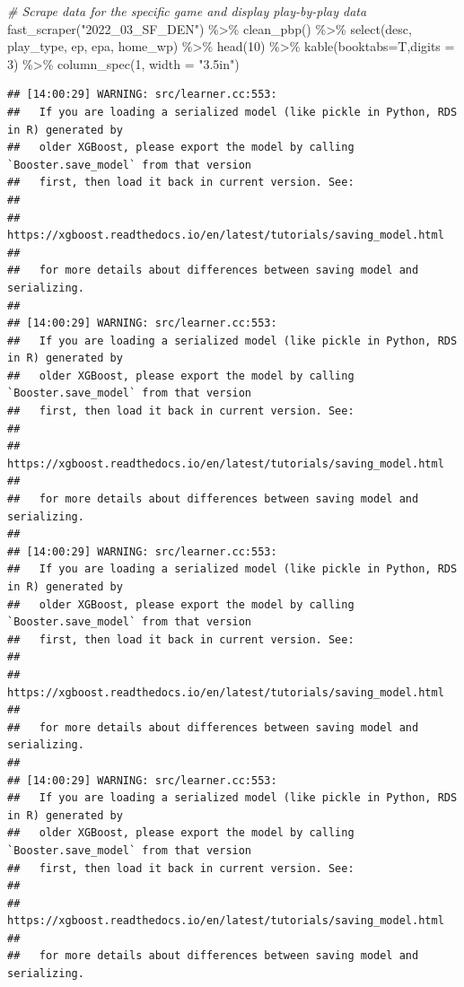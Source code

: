 \documentclass[
  11pt,
]{book}
\newenvironment{Shaded}{\begin{snugshade}}{\end{snugshade}}
\newcommand{\AttributeTok}[1]{\textcolor[rgb]{0.77,0.63,0.00}{#1}}
\newcommand{\CommentTok}[1]{\textcolor[rgb]{0.56,0.35,0.01}{\textit{#1}}}
\newcommand{\DecValTok}[1]{\textcolor[rgb]{0.00,0.00,0.81}{#1}}
\newcommand{\FunctionTok}[1]{\textcolor[rgb]{0.00,0.00,0.00}{#1}}
\newcommand{\NormalTok}[1]{#1}
\newcommand{\SpecialCharTok}[1]{\textcolor[rgb]{0.00,0.00,0.00}{#1}}
\newcommand{\StringTok}[1]{\textcolor[rgb]{0.31,0.60,0.02}{#1}}
\theoremstyle{definition}
\theoremstyle{definition}
\theoremstyle{definition}
\theoremstyle{definition}
\theoremstyle{remark}
\begin{document}
\newpage

\begin{Shaded}
\begin{Highlighting}[]
\CommentTok{\# Scrape data for the specific game and display play{-}by{-}play data}
\FunctionTok{fast\_scraper}\NormalTok{(}\StringTok{"2022\_03\_SF\_DEN"}\NormalTok{) }\SpecialCharTok{\%\textgreater{}\%}
  \FunctionTok{clean\_pbp}\NormalTok{() }\SpecialCharTok{\%\textgreater{}\%}
  \FunctionTok{select}\NormalTok{(desc, play\_type, ep, epa, home\_wp) }\SpecialCharTok{\%\textgreater{}\%}
  \FunctionTok{head}\NormalTok{(}\DecValTok{10}\NormalTok{) }\SpecialCharTok{\%\textgreater{}\%}
  \FunctionTok{kable}\NormalTok{(}\AttributeTok{booktabs=}\NormalTok{T,}\AttributeTok{digits =} \DecValTok{3}\NormalTok{) }\SpecialCharTok{\%\textgreater{}\%}
  \FunctionTok{column\_spec}\NormalTok{(}\DecValTok{1}\NormalTok{, }\AttributeTok{width =} \StringTok{"3.5in"}\NormalTok{)}
\end{Highlighting}
\end{Shaded}

\begin{verbatim}
## [14:00:29] WARNING: src/learner.cc:553: 
##   If you are loading a serialized model (like pickle in Python, RDS in R) generated by
##   older XGBoost, please export the model by calling `Booster.save_model` from that version
##   first, then load it back in current version. See:
## 
##     https://xgboost.readthedocs.io/en/latest/tutorials/saving_model.html
## 
##   for more details about differences between saving model and serializing.
## 
## [14:00:29] WARNING: src/learner.cc:553: 
##   If you are loading a serialized model (like pickle in Python, RDS in R) generated by
##   older XGBoost, please export the model by calling `Booster.save_model` from that version
##   first, then load it back in current version. See:
## 
##     https://xgboost.readthedocs.io/en/latest/tutorials/saving_model.html
## 
##   for more details about differences between saving model and serializing.
## 
## [14:00:29] WARNING: src/learner.cc:553: 
##   If you are loading a serialized model (like pickle in Python, RDS in R) generated by
##   older XGBoost, please export the model by calling `Booster.save_model` from that version
##   first, then load it back in current version. See:
## 
##     https://xgboost.readthedocs.io/en/latest/tutorials/saving_model.html
## 
##   for more details about differences between saving model and serializing.
## 
## [14:00:29] WARNING: src/learner.cc:553: 
##   If you are loading a serialized model (like pickle in Python, RDS in R) generated by
##   older XGBoost, please export the model by calling `Booster.save_model` from that version
##   first, then load it back in current version. See:
## 
##     https://xgboost.readthedocs.io/en/latest/tutorials/saving_model.html
## 
##   for more details about differences between saving model and serializing.
\end{verbatim}
\end{document}
